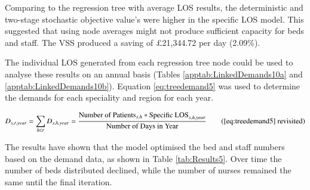 \documentclass[../thesis.tex]{subfiles}
\begin{document}
Comparing to the regression tree with average LOS results, the deterministic and two-stage stochastic objective value's were higher in the specific LOS model. This suggested that using node averages might not produce sufficient capacity for beds and staff. The VSS produced a saving of $\pounds$21,344.72 per day (2.09\%). 

The individual LOS generated from each regression tree node could be used to analyse these results on an annual basis (Tables \ref{apptab:LinkedDemands10a} and \ref{apptab:LinkedDemands10b}). Equation \eqref{eq:treedemand5} was used to determine the demands for each speciality and region for each year.

\begin{equation}
        D_{s,r,year} = \sum\limits_{h \in r} D_{s,h,year} = \frac{\text{Number of Patients}_{s,h}*{\text{Specific LOS}_{s,h,year}}}{{\text{Number of Days in Year}}} \tag{\ref{eq:treedemand5} revisited}
\end{equation}

The results have shown that the model optimised the bed and staff numbers based on the demand data, as shown in Table \ref{tab:Results5}. Over time the number of beds distributed declined, while the number of nurses remained the same until the final iteration.%
\end{document}
